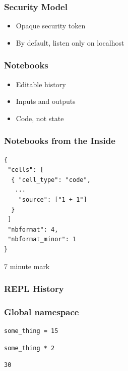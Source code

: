 \begin{frame}
\frametitle{Security Model}

\begin{itemize}
\item Opaque security token
\item By default, listen only on localhost
\end{itemize}

\end{frame}

\begin{frame}
\frametitle{Notebooks}

\begin{itemize}
\item Editable history
\item Inputs and outputs
\item Code, not state
\end{itemize}

\end{frame}

\begin{frame}[fragile]
\frametitle{Notebooks from the Inside}

\begin{lstlisting}
{
 "cells": [
  { "cell_type": "code",
   ...
    "source": ["1 + 1"]
  }
 ]
 "nbformat": 4,
 "nbformat_minor": 1
}
\end{lstlisting}

\end{frame}

7 minute mark

\begin{frame}
\frametitle{REPL History}
\end{frame}

\begin{frame}[fragile]
\frametitle{Global namespace}

\begin{lstlisting}[frame=single]
some_thing = 15
\end{lstlisting}

\begin{lstlisting}[frame=single]
some_thing * 2
\end{lstlisting}

\begin{lstlisting}[frame=single]
30
\end{lstlisting}

\end{frame}

